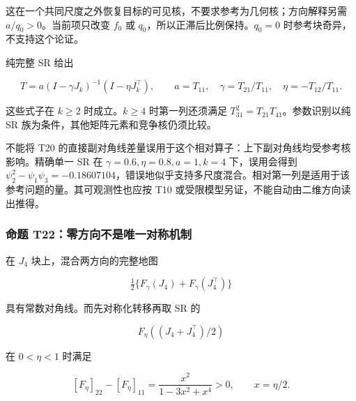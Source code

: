 \documentclass[11pt,a4paper]{article}
\begin{document}
这在一个共同尺度之外恢复目标的可见核，不要求参考为几何核；方向解释另需
\(a/q_0>0\)。当前项只改变 \(f_0\) 或
\(q_0\)，所以正滞后比例保持。\(q_0=0\) 时参考块奇异，不支持这个论证。

\par
\noindent\begin{minipage}{\linewidth}

纯完整 SR 给出

\[
T=a(I-\gamma J_k)^{-1}(I-\eta J_k^\top),
\qquad a=T_{11},\quad
\gamma=T_{21}/T_{11},\quad
\eta=-T_{12}/T_{11}.
\]

\end{minipage}\par

这些式子在 \(k\ge2\) 时成立。\(k\ge4\) 时第一列还须满足
\(T_{31}^2=T_{21}T_{41}\)。参数识别以纯 SR
族为条件，其他矩阵元素和竞争核仍须比较。

不能将 T20
的直接副对角线差量误用于这个相对算子：上下副对角线均受参考核影响。精确单一
SR 在 \(\gamma=0.6,\eta=0.8,a=1,k=4\) 下，误用会得到
\(\psi_2^2-\psi_1\psi_3=-0.18607104\)，错误地似乎支持多尺度混合。相对第一列是适用于该参考问题的量。其可观测性也应按
T10 或受限模型另证，不能自动由二维方向读出推得。

\subsubsection{命题
T22：零方向不是唯一对称机制}\label{ux547dux9898-t22ux96f6ux65b9ux5411ux4e0dux662fux552fux4e00ux5bf9ux79f0ux673aux5236}

\par
\noindent\begin{minipage}{\linewidth}

在 \(J_4\) 块上，混合两方向的完整地图

\[
\tfrac12\{F_\gamma(J_4)+F_\gamma(J_4^\top)\}
\]

\end{minipage}\par

\par
\noindent\begin{minipage}{\linewidth}

具有常数对角线。而先对称化转移再取 SR 的

\[
F_\eta((J_4+J_4^\top)/2)
\]

\end{minipage}\par

\par
\noindent\begin{minipage}{\linewidth}

在 \(0<\eta<1\) 时满足

\[
[F_\eta]_{22}-[F_\eta]_{11}
=\frac{x^2}{1-3x^2+x^4}>0,\qquad x=\eta/2.
\]

\end{minipage}\par
\end{document}
